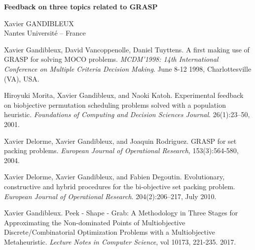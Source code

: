 \documentclass[10pt,xcolor=dvipsnames]{beamer}
\begin{document}
\begin{frame}


\vspace{10mm}

\begin{center}
    

\textbf{Feedback on three topics related to GRASP}

{\small
Xavier GANDIBLEUX\\ Nantes Université -- France
}
\end{center}
\vspace{7mm}

{\scriptsize 

Xavier Gandibleux, David Vancoppenolle, Daniel Tuyttens.
A first making use of GRASP for solving MOCO problems. 
 \textit{MCDM'1998: 14th International Conference on Multiple Criteria Decision Making}. June 8-12 1998, Charlottesville (VA), USA.
 
Hiroyuki Morita, Xavier Gandibleux, and Naoki Katoh. 
Experimental feedback on biobjective permutation scheduling problems solved with a population heuristic. 
\textit{Foundations of Computing and Decision Sciences Journal}. 26(1):23–50, 2001.

Xavier Delorme, Xavier Gandibleux, and Joaquin Rodriguez. 
GRASP for set packing problems.
 \textit{European Journal of Operational Research}, 153(3):564-580, 2004.
 
Xavier Delorme, Xavier Gandibleux, and Fabien Degoutin. 
Evolutionary, constructive and hybrid procedures for the bi-objective set packing problem. 
\textit{European Journal of Operational Research}. 204(2):206–217, July 2010.
 
 Xavier Gandibleux. 
Peek - Shape - Grab: A Methodology in Three Stages for Approximating the Non-dominated Points of Multiobjective Discrete/Combinatorial Optimization Problems with a Multiobjective Metaheuristic. \textit{Lecture Notes in Computer Science}, vol 10173, 221-235. 2017.

}

\end{frame}




\begin{frame}[standout]


\end{frame}
\end{document}
